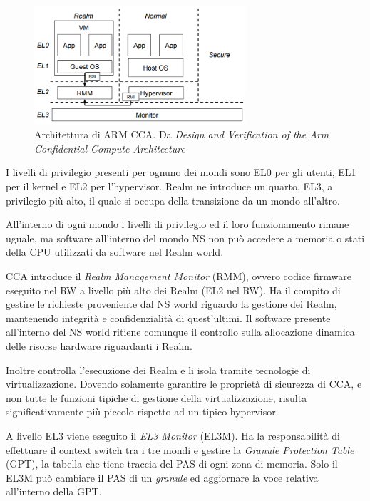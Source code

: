 \documentclass[12pt,italian]{report}
\begin{document}
	\begin{figure}[h]
		\centering
		\includegraphics[width=0.7\textwidth]{immagini/CCA_Arch}
		\caption{ Architettura di ARM CCA. Da \textit{Design and Verification of the Arm Confidential Compute Architecture} \cite{arm_cca_presentation}}
		\label{fig:cca_arch}
	\end{figure}

	I livelli di privilegio presenti per ognuno dei mondi sono EL0 per gli utenti, EL1 per il kernel e EL2 per l'hypervisor. Realm ne introduce un quarto, EL3, a privilegio più alto, il quale si occupa della transizione da un mondo all'altro.

	All'interno di ogni mondo i livelli di privilegio ed il loro funzionamento rimane uguale, ma software all'interno del mondo NS non può accedere a memoria o stati della CPU utilizzati da software nel Realm world.

	\bigbreak

	CCA introduce il \textit{Realm Management Monitor} (RMM), ovvero codice firmware eseguito nel RW a livello più alto dei Realm (EL2 nel RW). Ha il compito di gestire le richieste proveniente dal NS world riguardo la gestione dei Realm, mantenendo integrità e confidenzialità di quest'ultimi. Il software presente all'interno del NS world ritiene comunque il controllo sulla allocazione dinamica delle risorse hardware riguardanti i Realm. 
	
	Inoltre controlla l'esecuzione dei Realm e li isola tramite tecnologie di virtualizzazione. Dovendo solamente garantire le proprietà di sicurezza di CCA, e non tutte le funzioni tipiche di gestione della virtualizzazione, risulta significativamente più piccolo rispetto ad un tipico hypervisor.

	\bigbreak

	A livello EL3 viene eseguito il \textit{EL3 Monitor} (EL3M). Ha la responsabilità di effettuare il context switch tra i tre mondi e gestire la \textit{Granule Protection Table} (GPT), la tabella che tiene traccia del PAS di ogni zona di memoria. Solo il EL3M può cambiare il PAS di un \textit{granule} ed aggiornare la voce relativa all'interno della GPT.
\end{document}
